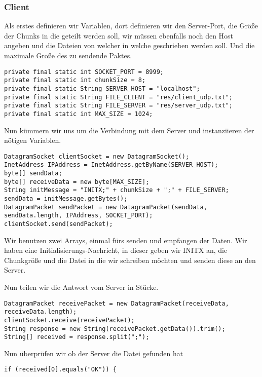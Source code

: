 \subsubsection{Client}
Als erstes definieren wir Variablen, dort definieren wir den Server-Port, die Größe der Chunks in die geteilt werden soll, wir müssen ebenfalls noch den Host angeben und die Dateien von welcher in welche geschrieben werden soll. Und die maximale Große des zu sendende Paktes. 

\begin{lstlisting}
private final static int SOCKET_PORT = 8999;
private final static int chunkSize = 8;
private final static String SERVER_HOST = "localhost";
private final static String FILE_CLIENT = "res/client_udp.txt";
private final static String FILE_SERVER = "res/server_udp.txt";
private final static int MAX_SIZE = 1024;
\end{lstlisting}

Nun kümmern wir uns um die Verbindung mit dem Server und instanziieren der nötigen Variablen. 

\begin{lstlisting}
DatagramSocket clientSocket = new DatagramSocket();
InetAddress IPAddress = InetAddress.getByName(SERVER_HOST);
byte[] sendData;
byte[] receiveData = new byte[MAX_SIZE];
String initMessage = "INITX;" + chunkSize + ";" + FILE_SERVER;
sendData = initMessage.getBytes();
DatagramPacket sendPacket = new DatagramPacket(sendData, sendData.length, IPAddress, SOCKET_PORT);
clientSocket.send(sendPacket);
\end{lstlisting}

Wir benutzen zwei Arrays, einmal fürs senden und empfangen der Daten. Wir haben eine Initialisierungs-Nachricht, in dieser geben wir INITX an, die Chunkgröße und die Datei in die wir schreiben möchten und senden diese an den Server.

Nun teilen wir die Antwort vom Server in Stücke.

\begin{lstlisting}
DatagramPacket receivePacket = new DatagramPacket(receiveData, receiveData.length);
clientSocket.receive(receivePacket);
String response = new String(receivePacket.getData()).trim();
String[] received = response.split(";");
\end{lstlisting}

Nun überprüfen wir ob der Server die Datei gefunden hat

\begin{lstlisting}
if (received[0].equals("OK")) {
\end{lstlisting}

